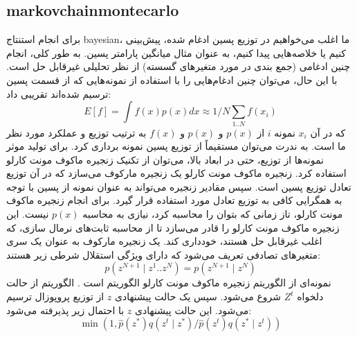\subsection{\gls{markovchainmontecarlo}}

برای انجام استنتاج \gls{bayesian}، ما اغلب می‌خواهیم در توزیع پسین ادغام شده، پیش‌بینی کنیم یا خلاصه‌هایی پیدا کنیم، به عنوان مثال میانگین پارامتر پسین. به طور کلی، انجام چنین ادغامی (جمع بندی در مورد متغیرهای گسسته) از نظر تحلیلی غیرقابل حل است. با این حال، می‌توان چنین ادغام‌هایی را با استفاده از نمونه‌هایی که از قسمت پسین ترسیم شده‌اند تقریبی داد:
\begin{equation}
	E[f]=\int f(x) p(x) d x \approx 1 / N \sum_{1 . . N} f\left(x_{i}\right)
\end{equation}
که در آن $x_i$  نمونه $i$ از $p(x)$ و $p(x)$  و $f(x)$ به ترتیب توزیع و عملکرد مورد نظر ما است. به ندرت می‌توان مستقیماً از توزیع پسین نمونه برداری کرد. برای تولید موثر نمونه‌ها از توزیع، حتی در ابعاد بالا، می‌توان از تکنیک زنجیره ماکوف مونت کارلو استفاده کرد. زنجیره ماکوف مونت کارلو یک زنجیره مارکوف می‌سازد که در آن توزیع تعادل توزیع پسین است. سپس مقادیر زنجیره می‌تواند به عنوان نمونه از پسین با توجه به همگرایی کافی به توزیع تعادل مورد استفاده قرار گیرد. برای انجام زنجیره ماکوف مونت کارلو، تاز زمانی که بتوان  را محاسبه کرد، نیازی به محاسبه $p(x)$  نیست. این زنجیره ماکوف مونت کارلو را قادر می‌سازد تا از محاسبه ثابت‌های نرمال سازی، که اغلب غیرقابل حل هستند، خودداری کند.
یک زنجیره مارکوف به عنوان یک سری متغیرهای تصادفی تعریف می‌شود که دارای ویژگی استقلال شرطی زیر هستند:
\begin{equation}
	p\left(z^{N+1} \mid z^{1} . . z^{N}\right)=p\left(z^{N+1} \mid z^{N}\right)
\end{equation}
نمونه‌ای از الگوریتم زنجیره ماکوف مونت کارلو الگوریتم  است \cite{hastings1970monte}. الگوریتم   از حالت دلخواه   $Z^t$ شروع می‌شود. سپس یک حالت پیشنهادی $z$  از توزیع پروپوزال  ترسیم می‌شود. این حالت پیشنهادی $z$   با احتمال زیر پذیرفته می‌شود:
\begin{equation}
	\min \left(1, \hat{p}\left(z^{*}\right) q\left(z^{t} \mid z^{*}\right) / \hat{p}\left(z^{t}\right) q\left(z^{*} \mid z^{t}\right)\right)
\end{equation}
